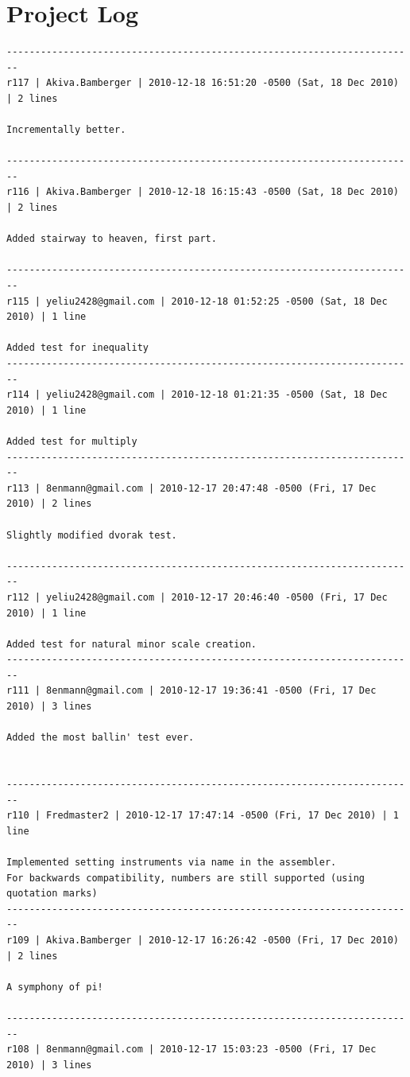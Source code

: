 \documentclass[12pt,A4]{book}
\begin{document}
\section{Project Log}
\begin{verbatim}
------------------------------------------------------------------------
r117 | Akiva.Bamberger | 2010-12-18 16:51:20 -0500 (Sat, 18 Dec 2010) | 2 lines

Incrementally better.

------------------------------------------------------------------------
r116 | Akiva.Bamberger | 2010-12-18 16:15:43 -0500 (Sat, 18 Dec 2010) | 2 lines

Added stairway to heaven, first part.

------------------------------------------------------------------------
r115 | yeliu2428@gmail.com | 2010-12-18 01:52:25 -0500 (Sat, 18 Dec 2010) | 1 line

Added test for inequality
------------------------------------------------------------------------
r114 | yeliu2428@gmail.com | 2010-12-18 01:21:35 -0500 (Sat, 18 Dec 2010) | 1 line

Added test for multiply
------------------------------------------------------------------------
r113 | 8enmann@gmail.com | 2010-12-17 20:47:48 -0500 (Fri, 17 Dec 2010) | 2 lines

Slightly modified dvorak test.

------------------------------------------------------------------------
r112 | yeliu2428@gmail.com | 2010-12-17 20:46:40 -0500 (Fri, 17 Dec 2010) | 1 line

Added test for natural minor scale creation.
------------------------------------------------------------------------
r111 | 8enmann@gmail.com | 2010-12-17 19:36:41 -0500 (Fri, 17 Dec 2010) | 3 lines

Added the most ballin' test ever.


------------------------------------------------------------------------
r110 | Fredmaster2 | 2010-12-17 17:47:14 -0500 (Fri, 17 Dec 2010) | 1 line

Implemented setting instruments via name in the assembler.
For backwards compatibility, numbers are still supported (using quotation marks)
------------------------------------------------------------------------
r109 | Akiva.Bamberger | 2010-12-17 16:26:42 -0500 (Fri, 17 Dec 2010) | 2 lines

A symphony of pi!

------------------------------------------------------------------------
r108 | 8enmann@gmail.com | 2010-12-17 15:03:23 -0500 (Fri, 17 Dec 2010) | 3 lines


\end{verbatim}
\end{document}

